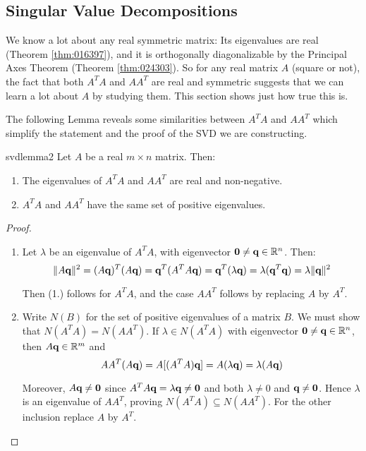 \subsection{Singular Value Decompositions}

\noindent We know a lot about any real symmetric matrix: Its eigenvalues are
real (Theorem \ref{thm:016397}), and it is orthogonally diagonalizable by the Principal
Axes Theorem (Theorem \ref{thm:024303}). So for any real matrix $A$ (square or not),
the fact that both $A^{T}A$ and $AA^{T}$ are real and symmetric suggests
that we can learn a lot about $A$ by studying them. This section shows just
how true this is.

The following Lemma reveals some similarities between $A^{T}A$ and $AA^{T}$
which simplify the statement and the proof of the SVD we are constructing.

\begin{lemma}{}{svdlemma2}
 Let $A$ be a real $m\times n$ matrix. Then:

\begin{enumerate}
\item The eigenvalues of $A^{T}A$ and $AA^{T}$ are real and non-negative.

\item $A^{T}A$ and $AA^{T}$ have the same set of positive eigenvalues.
\end{enumerate}
\end{lemma}

\begin{proof} 
\begin{enumerate}\item Let $\lambda $ be an eigenvalue of $A^{T}A$,
with eigenvector $\textbf{0}\neq \textbf{q}\in \mathbb{R}^{n}$.
Then:
\begin{equation*}
\| A\textbf{q}\|^{2}=(A\textbf{q})^{T}(A\textbf{q})=\textbf{q}^{T}(A^{T}A\textbf{q})=\textbf{q}^{T}(\lambda \textbf{q})=\lambda (\textbf{q}^{T}\textbf{q})=\lambda \| \textbf{q}\| ^{2}
\end{equation*}

\noindent Then (1.) follows for $A^{T}A$, and the case $AA^{T}$ follows by
replacing $A$ by $A^{T}$.

\item Write $N(B)$ for the set of positive eigenvalues of a matrix $B$. We
must show that $N(A^{T}A)=N(AA^{T})$. If $\lambda \in N(A^{T}A)$ with
eigenvector $\textbf{0}\neq \textbf{q}\in \mathbb{R}^{n}$, then $A\textbf{q}\in \mathbb{R}^{m}$ and 
\begin{equation*}
AA^{T}(A\textbf{q})=A[(A^{T}A)\textbf{q}]=A(\lambda \textbf{q})=\lambda (A\textbf{q})
\end{equation*}

\noindent Moreover, $A\textbf{q}\neq \textbf{0}$  since $A^{T}A\textbf{q}=\lambda \textbf{q}\neq \textbf{0}$ and both $\lambda \neq 0$ and $\textbf{q}\neq \textbf{0}$. Hence $\lambda $ is an eigenvalue of $AA^{T}$, proving $N(A^{T}A)\subseteq N(AA^{T})$. For the other inclusion replace $A$ by $A^{T}$.
\end{enumerate}
\vspace*{-1em}
\end{proof}

